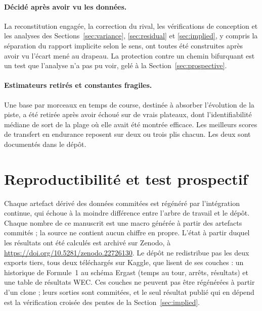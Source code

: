 \documentclass[11pt,a4paper]{article}
\begin{document}
\paragraph{Décidé après avoir vu les données.} La reconstitution engagée, la
correction du rival, les vérifications de conception et les analyses des
Sections~\ref{sec:variance}, \ref{sec:residual} et \ref{sec:implied}, y compris
la séparation du rapport implicite selon le sens, ont toutes été construites
après avoir vu l'écart mené au drapeau. La protection contre un
chemin bifurquant est un test que l'analyse n'a pas pu voir, gelé à la
Section~\ref{sec:prospective}.

\paragraph{Estimateurs retirés et constantes fragiles.} Une base par morceaux en
temps de course, destinée à absorber l'évolution de la piste, a été retirée après
avoir échoué sur de vrais plateaux, dont l'identifiabilité médiane de
\NIdentifiability{} sort de la plage où elle avait été montrée efficace. Les
meilleurs scores de transfert en endurance reposent sur deux ou trois plis
chacun. Les deux sont documentés dans le dépôt.

\section{Reproductibilité et test prospectif}
\label{sec:reproducibility}

Chaque artefact dérivé des données commitées est régénéré par l'intégration
continue, qui échoue à la moindre différence entre l'arbre de travail et le dépôt.
Chaque nombre de ce manuscrit est une macro générée à partir des artefacts
commités ; la source ne contient aucun chiffre en propre. L'état à partir duquel
les résultats ont été calculés est archivé sur Zenodo, à
\url{https://doi.org/10.5281/zenodo.22726130}. Le dépôt ne redistribue pas les
deux exports tiers, tous deux téléchargés sur Kaggle, que lisent
\NBlockedLayers{} de ses couches : un historique de Formule~1 au schéma Ergast
(temps au tour, arrêts, résultats) et une table de résultats WEC. Ces couches ne
peuvent pas être régénérées à partir d'un clone ; leurs sorties sont commitées, et
le seul résultat publié qui en dépend est la vérification croisée des pentes de
la Section~\ref{sec:implied}.
\end{document}
